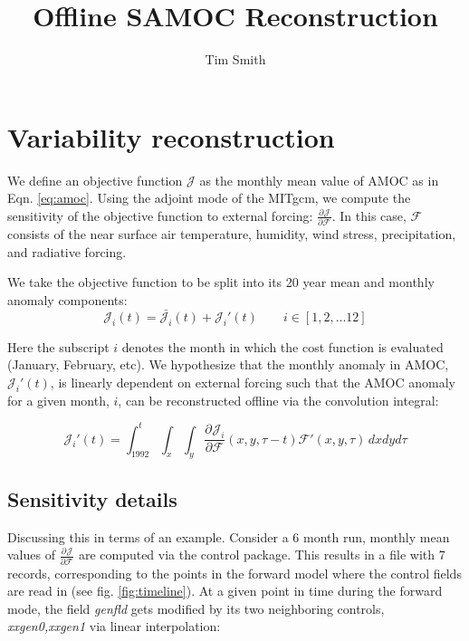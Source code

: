 \documentclass[a4paper,11pt]{article}
\title{\vspace{-10ex}Offline SAMOC Reconstruction}
\author{Tim Smith}
\date{\vspace{-3ex}}
\newcommand{\pderiv}[3][]{%
  \ensuremath{\frac{\partial^{#1} {#2}}{\partial {#3}^{#1}}}}
\begin{document}
\maketitle
  \section{Variability reconstruction}
  \label{linearSensitivity}
  
  We define an objective function $\mathcal{J}$ as the monthly mean value of AMOC as in Eqn. \ref{eq:amoc}. Using the adjoint mode of the MITgcm, we compute the sensitivity of the objective function to external forcing: $\pderiv{\mathcal{J}}{\mathcal{F}}$. In this case, $\mathcal{F}$ consists of the near surface air temperature, humidity, wind stress, precipitation, and radiative forcing.  
	
  We take the objective function to be split into its 20 year mean and monthly anomaly components: 
	\begin{equation}
	  \mathcal{J}_i(t) = \bar{\mathcal{J}_i}(t) + \mathcal{J}_i'(t) \qquad i \in [1, 2, ... 12]
	\end{equation}

  Here the subscript $i$ denotes the month in which the cost function is evaluated (January, February, etc). We hypothesize that the monthly anomaly in AMOC, $\mathcal{J}_i'(t)$, is linearly dependent on external forcing such that the AMOC anomaly for a given month, $i$, can be reconstructed offline via the convolution integral:
 
	\begin{equation}
	  \mathcal{J}_i'(t) = \int_{1992}^{t}\int_x \int_y\pderiv{\mathcal{J}_i}{\mathcal{F}}(x,y,\tau-t)\mathcal{F}'(x,y,\tau)\, dxdyd\tau  
	  \label{eq:reconstruct}
	\end{equation}

  
  \subsection{Sensitivity details}
  
  Discussing this in terms of an example. Consider a 6 month run, monthly mean values of $\pderiv{\mathcal{J}}{\mathcal{F}}$ are computed via the control package. This results in a file with 7 records, corresponding to the points in the forward model where the control fields are read in (see fig. \ref{fig:timeline}). At a given point in time during the forward mode, the field \textit{genfld} gets modified by its two neighboring controls, \textit{xxgen0,xxgen1} via linear interpolation:
\end{document}
